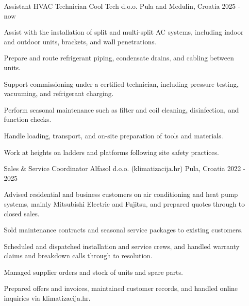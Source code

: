 

\begin{cventries}

  \cventry
    {Assistant HVAC Technician} %
    {Cool Tech d.o.o.} %
    {Pula and Medulin, Croatia} %
    {2025 - now} %
    {
      \begin{cvitems} %
        \item {Assist with the installation of split and multi-split AC systems, including indoor and outdoor units, brackets, and wall penetrations.}
        \item {Prepare and route refrigerant piping, condensate drains, and cabling between units.}
        \item {Support commissioning under a certified technician, including pressure testing, vacuuming, and refrigerant charging.}
        \item {Perform seasonal maintenance such as filter and coil cleaning, disinfection, and function checks.}
        \item {Handle loading, transport, and on-site preparation of tools and materials.}
        \item {Work at heights on ladders and platforms following site safety practices.}
      \end{cvitems}
    }

  \cventry
    {Sales \& Service Coordinator} %
    {Alfasol d.o.o. (klimatizacija.hr)} %
    {Pula, Croatia} %
    {2022 - 2025} %
    {
      \begin{cvitems} %
        \item {Advised residential and business customers on air conditioning and heat pump systems, mainly Mitsubishi Electric and Fujitsu, and prepared quotes through to closed sales.}
        \item {Sold maintenance contracts and seasonal service packages to existing customers.}
        \item {Scheduled and dispatched installation and service crews, and handled warranty claims and breakdown calls through to resolution.}
        \item {Managed supplier orders and stock of units and spare parts.}
        \item {Prepared offers and invoices, maintained customer records, and handled online inquiries via klimatizacija.hr.}
      \end{cvitems}
    }


\end{cventries}
